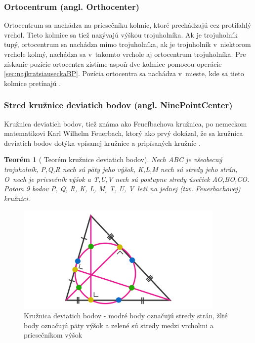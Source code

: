 \subsubsection{Ortocentrum (angl. Orthocenter)}
Ortocentrum sa nachádza na priesečníku kolmíc, ktoré prechádzajú cez protiľahlý vrchol. Tieto kolmice sa tiež nazývajú výškou trojuholníka. 
Ak je trojuholník tupý, ortocentrum sa nachádza mimo trojuholníka, ak je trojuholník v~niektorom vrchole kolmý, nachádza sa v~takomto vrchole aj ortocentrum trojuholníka.
Pre získanie pozície ortocentra zistíme aspoň dve kolmice pomocou operácie \ref{sec:najkratsiauseckaBP}. Pozícia ortocentra sa nachádza v~mieste, kde sa tieto kolmice pretínajú \cite{kelley2013humongous}. 


\subsubsection{Stred kružnice deviatich bodov (angl. NinePointCenter)}

Kružnica deviatich bodov, tiež známa ako Feuefbachova kružnica, po nemeckom matematikovi Karl Wilhelm Feuerbach, ktorý ako prvý dokázal, že sa kružnica deviatich bodov dotýka vpísanej kružnice a pripísaných kružníc \cite{NinePointTheorem}.


\newtheorem{theorem}{Teorém}
 
\begin{theorem}[{\cite{vyznamne_prvky_trojuholnika} Teorém kružnice deviatich bodov}]
Nech ABC je všeobecný trojuholník, P,Q,R nech sú päty jeho výšok, K,L,M nech sú stredy jeho strán, O~nech je priesečník výšok a T,U,V nech sú postupne stredy úsečiek AO,BO,CO. Potom 9 bodov P, Q, R, K, L, M, T, U, V~leží na jednej (tzv. Feuerbachovej) kružnici. 

\end{theorem}


\begin{figure}[H]
	\centering
	\includegraphics[width=0.9\textwidth]{obrazky-figures/NinePointCircle.png}
	\caption{Kružnica deviatich bodov - modré body označujú stredy strán, žlté body označujú päty výšok a zelené sú stredy medzi vrcholmi a priesečníkom výšok \protect\footnotemark
	}
	\label{fig:TriangleCenters_ninePoints}
\end{figure}

